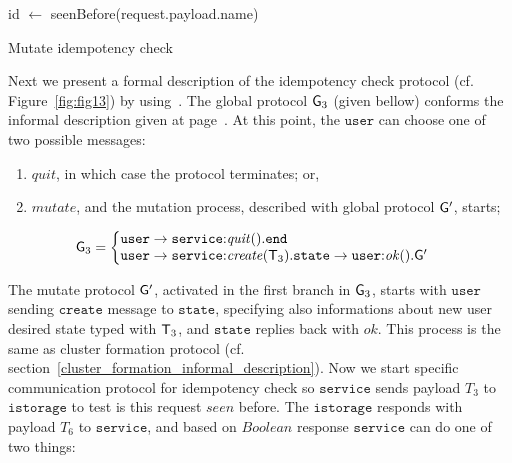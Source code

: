 \begin{algorithm}[H]
	
	\SetAlgoLined
	id $\leftarrow$ seenBefore(request.payload.name)\\
	\caption{Mutate idempotency check}
	\label{alg:alg6}
\end{algorithm}

Next we present a formal description of the idempotency check protocol (cf. Figure~\ref{fig:fig13}) by using~\cite{HuY17}. The global protocol ${\sf G}_3$ (given bellow) conforms the informal description given at page~\pageref{informal_description_idempotency}. At this point, the $\mathtt{user}$ can choose one of two possible messages: 

\begin{enumerate}[start=1,label={(\bfseries \arabic*)}]
\item $\mathit{quit}$, in which case the protocol terminates; or, 
\item $\mathit{mutate}$, and the mutation process, described with global protocol ${\sf G}'$, starts;
\end{enumerate}

\begin{align*}
\G_3 & = 
\left\{
\begin{array}{@{}l@{}}  
\mathtt{user}\to\mathtt{service}{:} \mathit{quit}().\tend\\
\mathtt{user} \to \mathtt{service}{:}\mathit{create}(\T_3).
\mathtt{state} \to \mathtt{user}{:}\mathit{ok}().\G'
\end{array} \right.
\end{align*}

The mutate protocol ${\sf G}'$, activated in the first branch in ${\sf G}_3$, starts with $\mathtt{user}$ sending 
$\mathtt{create}$ message to $\mathtt{state}$, specifying also informations about new user desired state typed with ${\mathsf T}_3$, 
and $\mathtt{state}$ replies back with $\mathit{ok}$. This process is the same as cluster formation protocol (cf. section~\ref{cluster_formation_informal_description}). Now we start specific communication protocol for idempotency check so $\mathtt{service}$ sends payload $T_3$ to $\mathtt{istorage}$ to test is this request $seen$ before. The $\mathtt{istorage}$ responds with payload $T_6$ to $\mathtt{service}$, and based on $Boolean$ response $\mathtt{service}$ can do one of two things:

